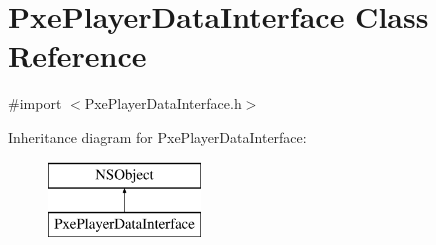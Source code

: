 \hypertarget{interface_pxe_player_data_interface}{\section{Pxe\-Player\-Data\-Interface Class Reference}
\label{interface_pxe_player_data_interface}
}


{\ttfamily \#import $<$Pxe\-Player\-Data\-Interface.\-h$>$}

Inheritance diagram for Pxe\-Player\-Data\-Interface\-:\begin{figure}[H]
\begin{center}
\leavevmode
\includegraphics[height=2.000000cm]{interface_pxe_player_data_interface}
\end{center}
\end{figure}
